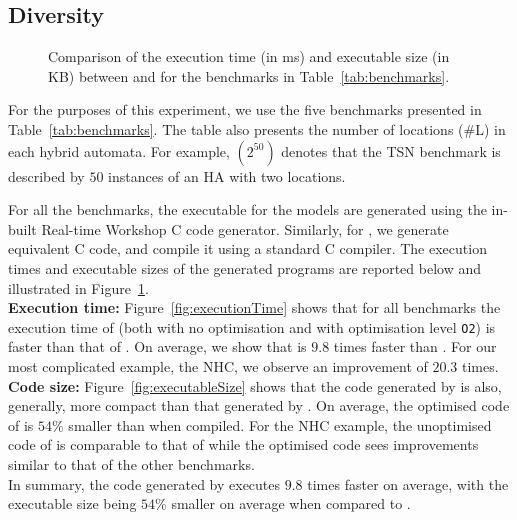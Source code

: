 \subsection{Diversity}

\begin{figure}[htbp]
	\centering
	\caption{Comparison of the execution time (in ms) and executable size (in KB) between \simulink and \ourTool for the benchmarks in Table~\ref{tab:benchmarks}.}
	\label{fig:results}
\end{figure}

For the purposes of this experiment, we use the five benchmarks presented in Table~\ref{tab:benchmarks}.
The table also presents the number of locations (\#L) in each hybrid automata.
For example, $(2^{50})$ denotes that the \acf{TSN} benchmark is described by $50$ instances of an \ac{HA} with two locations.

For all the benchmarks, the executable for the \simulink models are generated using the in-built Real-time Workshop\textsuperscript{\textregistered} C code generator.
Similarly, for \ourTool, we generate equivalent C code, and compile it using a standard C compiler.
The execution times and executable sizes of the generated programs are reported below and illustrated in Figure~\ref{fig:results}.\\

\textbf{Execution time:} 
Figure~\ref{fig:executionTime} shows that for all benchmarks the execution time of \ourTool (both with no optimisation and with optimisation level \texttt{O2}) is faster than that of \simulink.
On average, we show that \ourTool is $9.8$ times faster than \simulink.
For our most complicated example, the \ac{NHC}, we observe an improvement of $20.3$ times.\\

\textbf{Code size:}
Figure~\ref{fig:executableSize} shows that the code generated by \ourTool is also, generally, more compact than that generated by \simulink.
On average, the optimised code of \ourTool is $54\%$ smaller than \simulink when compiled.
For the \ac{NHC} example, the unoptimised code of \ourTool is comparable to that of \simulink while the optimised code sees improvements similar to that of the other benchmarks.\\

In summary, the code generated by \ourTool executes $9.8$ times faster on average, with the executable size being $54\%$ smaller on average when compared to \simulink.
\



